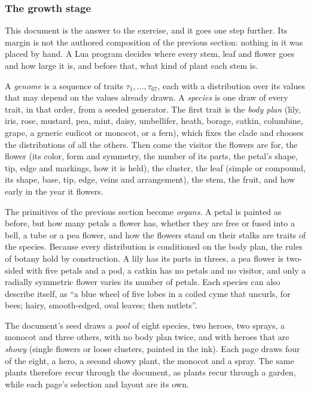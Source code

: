 \subsubsection{The growth stage}

This document is the answer to the exercise, and it goes one step further. Its margin is not
the authored composition of the previous section: nothing in it was placed by hand. A Lua
program decides where every stem, leaf and flower goes and how large it is, and before that,
what kind of plant each stem is.

\begin{definition}
A \emph{genome} is a sequence of traits $\tau_1,\dots,\tau_{67}$, each with a distribution over
its values that may depend on the values already drawn. A \emph{species} is one draw of every
trait, in that order, from a seeded generator. The first trait is the \emph{body plan} (lily,
iris, rose, mustard, pea, mint, daisy, umbellifer, heath, borage, catkin, columbine, grape, a
generic eudicot or monocot, or a fern), which fixes the clade and chooses the distributions of all the
others. Then come the visitor the flowers are for, the flower (its color, form and symmetry,
the number of its parts, the petal's shape, tip, edge and markings, how it is held), the
cluster, the leaf (simple or compound, its shape, base, tip, edge, veins and arrangement), the
stem, the fruit, and how early in the year it flowers.
\end{definition}

The primitives of the previous section become \emph{organs}. A petal is painted as before, but
how many petals a flower has, whether they are free or fused into a bell, a tube or a pea
flower, and how the flowers stand on their stalks are traits of the species. Because every
distribution is conditioned on the body plan, the rules of botany hold by construction. A lily
has its parts in threes, a pea flower is two-sided with five petals and a pod, a catkin has no
petals and no visitor, and only a radially symmetric flower varies its number of petals. Each
species can also describe itself, as ``a blue wheel of five lobes in a coiled cyme that
uncurls, for bees; hairy, smooth-edged, oval leaves; then nutlets''.

\begin{construction}[Community]
The document's seed draws a \emph{pool} of eight species, two heroes, two sprays, a monocot
and three others, with no body plan twice, and with heroes that are \emph{showy} (single
flowers or loose clusters, painted in the ink). Each page draws four of the eight, a hero, a
second showy plant, the monocot and a spray. The same plants therefore recur through the
document, as plants recur through a garden, while each page's selection and layout are its
own.
\end{construction}

